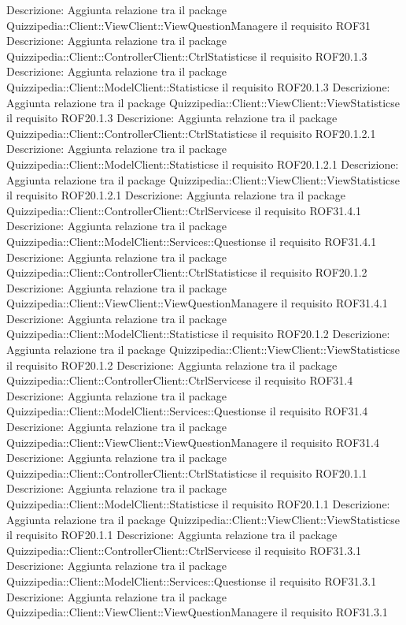 Descrizione: Aggiunta relazione tra il package Quizzipedia::Client::ViewClient::ViewQuestionManagere il requisito ROF31 
Descrizione: Aggiunta relazione tra il package Quizzipedia::Client::ControllerClient::CtrlStatisticse il requisito ROF20.1.3 
Descrizione: Aggiunta relazione tra il package Quizzipedia::Client::ModelClient::Statisticse il requisito ROF20.1.3 
Descrizione: Aggiunta relazione tra il package Quizzipedia::Client::ViewClient::ViewStatisticse il requisito ROF20.1.3 
Descrizione: Aggiunta relazione tra il package Quizzipedia::Client::ControllerClient::CtrlStatisticse il requisito ROF20.1.2.1 
Descrizione: Aggiunta relazione tra il package Quizzipedia::Client::ModelClient::Statisticse il requisito ROF20.1.2.1 
Descrizione: Aggiunta relazione tra il package Quizzipedia::Client::ViewClient::ViewStatisticse il requisito ROF20.1.2.1 
Descrizione: Aggiunta relazione tra il package Quizzipedia::Client::ControllerClient::CtrlServicese il requisito ROF31.4.1 
Descrizione: Aggiunta relazione tra il package Quizzipedia::Client::ModelClient::Services::Questionse il requisito ROF31.4.1 
Descrizione: Aggiunta relazione tra il package Quizzipedia::Client::ControllerClient::CtrlStatisticse il requisito ROF20.1.2 
Descrizione: Aggiunta relazione tra il package Quizzipedia::Client::ViewClient::ViewQuestionManagere il requisito ROF31.4.1 
Descrizione: Aggiunta relazione tra il package Quizzipedia::Client::ModelClient::Statisticse il requisito ROF20.1.2 
Descrizione: Aggiunta relazione tra il package Quizzipedia::Client::ViewClient::ViewStatisticse il requisito ROF20.1.2 
Descrizione: Aggiunta relazione tra il package Quizzipedia::Client::ControllerClient::CtrlServicese il requisito ROF31.4 
Descrizione: Aggiunta relazione tra il package Quizzipedia::Client::ModelClient::Services::Questionse il requisito ROF31.4 
Descrizione: Aggiunta relazione tra il package Quizzipedia::Client::ViewClient::ViewQuestionManagere il requisito ROF31.4 
Descrizione: Aggiunta relazione tra il package Quizzipedia::Client::ControllerClient::CtrlStatisticse il requisito ROF20.1.1 
Descrizione: Aggiunta relazione tra il package Quizzipedia::Client::ModelClient::Statisticse il requisito ROF20.1.1 
Descrizione: Aggiunta relazione tra il package Quizzipedia::Client::ViewClient::ViewStatisticse il requisito ROF20.1.1 
Descrizione: Aggiunta relazione tra il package Quizzipedia::Client::ControllerClient::CtrlServicese il requisito ROF31.3.1 
Descrizione: Aggiunta relazione tra il package Quizzipedia::Client::ModelClient::Services::Questionse il requisito ROF31.3.1 
Descrizione: Aggiunta relazione tra il package Quizzipedia::Client::ViewClient::ViewQuestionManagere il requisito ROF31.3.1 
